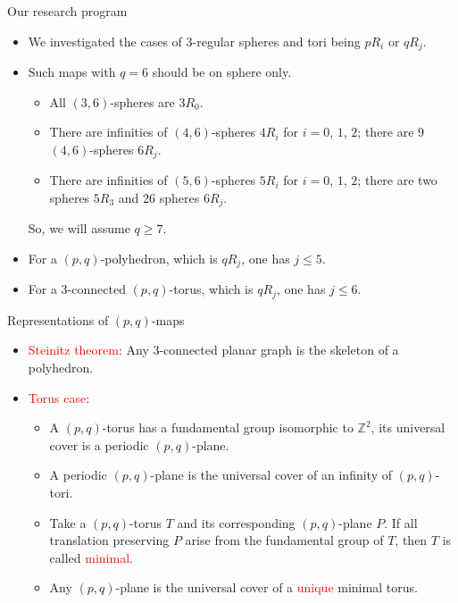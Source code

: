 \documentclass[%
pdf,
colorBG,
slideColor,
]{prosper}
\newcommand{\ZZ}{\ensuremath{\mathbb{Z}}}
\begin{document}
\begin{slide}{Our research program}
\begin{itemize}
\item We investigated the cases of $3$-regular spheres and tori being
$pR_i$ or $qR_j$.
\item Such maps with $q=6$ should be on sphere only.
\begin{itemize}
\item All $(3,6)$-spheres are $3R_0$.
\item There are infinities of $(4,6)$-spheres $4R_i$ for $i=0$, $1$, $2$; there are $9$ $(4,6)$-spheres $6R_j$.
\item There are infinities of $(5,6)$-spheres $5R_i$ for $i=0$, $1$, $2$; there are two spheres $5R_3$ and $26$ spheres $6R_j$.
\end{itemize}
So, we will assume $q\geq 7$.
\item For a $(p,q)$-polyhedron, which is $qR_j$, one has $j\leq 5$.
\item For a $3$-connected $(p,q)$-torus, which is $qR_j$,
one has $j\leq 6$.

\end{itemize}
\end{slide}

\begin{slide}{Representations of $(p,q)$-maps}
\begin{itemize}
\item \textcolor{red}{Steinitz theorem}: Any $3$-connected planar graph is the skeleton of a polyhedron.
\item \textcolor{red}{Torus case}:
\begin{itemize}
\item A $(p,q)$-torus has a fundamental group isomorphic to $\ZZ^2$, its universal cover is a periodic $(p,q)$-plane.
\item A periodic $(p,q)$-plane is the universal cover of an infinity of $(p,q)$-tori.
\item Take a $(p,q)$-torus $T$ and its corresponding $(p,q)$-plane $P$.
If all translation preserving $P$ arise from the fundamental group of $T$,
then $T$ is called \textcolor{red}{minimal}.
\item Any $(p,q)$-plane is the universal cover of a \textcolor{red}{unique} minimal torus.
\end{itemize}



\end{itemize}
\end{slide}
\end{document}

